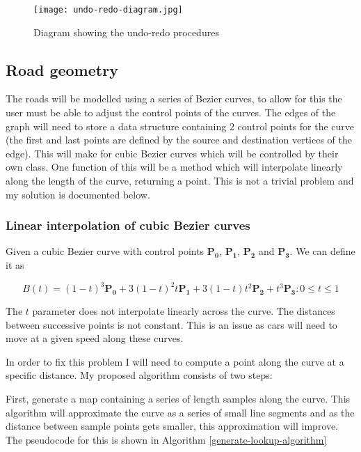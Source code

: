             \begin{figure}
                \centering
                \texttt{[image: undo-redo-diagram.jpg]}
                \caption{Diagram showing the undo-redo procedures}
                \label{undo-redo-diagram}
            \end{figure}

    \subsection{Road geometry}

    The roads will be modelled using a series of Bezier curves, to allow for this the user must be able to adjust the control points of the curves. The edges of the graph will need to store a data structure containing 2 control points for the curve (the first and last points are defined by the source and destination vertices of the edge). This will make for cubic Bezier curves which will be controlled by their own  class. One function of this will be a  method which will interpolate linearly along the length of the curve, returning a point. This is not a trivial problem and my solution is documented below.

    \subsubsection{Linear interpolation of cubic Bezier curves}
    \label{design:linear-interpolation-bezier}

    Given a cubic Bezier curve with control points $\mathbf{P_0}$, $\mathbf{P_1}$, $\mathbf{P_2}$ and $\mathbf{P_3}$. We can define it as

    \[B(t) = (1 - t)^3\mathbf{P_0} + 3(1 - t)^2t\mathbf{P_1} + 3(1 - t)t^2\mathbf{P_2} + t^3\mathbf{P_3} : 0 \leq t \leq 1\]

    The $t$ parameter does not interpolate linearly across the curve. The distances between successive points is not constant. This is an issue as cars will need to move at a given speed along these curves.

    In order to fix this problem I will need to compute a point along the curve at a specific distance. My proposed algorithm consists of two steps:

    First, generate a map containing a series of length samples along the curve. This algorithm will approximate the curve as a series of small line segments and as the distance between sample points gets smaller, this approximation will improve. The pseudocode for this is shown in Algorithm \ref{generate-lookup-algorithm}

